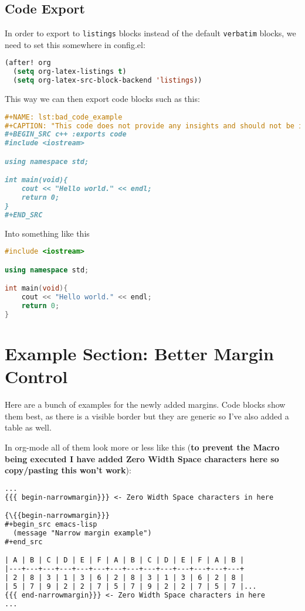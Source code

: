 \documentclass[a4paper,oneside,toc=bibliography,toc=listof]{scrbook}
\begin{document}
\section{Code Export}
\label{sec:orgecc9ca5}
In order to export to \texttt{listings} blocks instead of the default \texttt{verbatim} blocks, we need to set this somewhere in config.el:
\begin{lstlisting}[language=Lisp,numbers=none]
(after! org
  (setq org-latex-listings t)
  (setq org-latex-src-block-backend 'listings))
\end{lstlisting}

This way we can then export code blocks such as this:
\begin{lstlisting}[language=org,numbers=none]
#+NAME: lst:bad_code_example
#+CAPTION: "This code does not provide any insights and should not be included."
#+BEGIN_SRC c++ :exports code
#include <iostream>

using namespace std;

int main(void){
    cout << "Hello world." << endl;
    return 0;
}
#+END_SRC
\end{lstlisting}

Into something like this

\begin{lstlisting}[language=c++,label=lst:bad_code_example,caption={``This code does not provide any insights and should not be included.''},captionpos=b,numbers=none]
#include <iostream>

using namespace std;

int main(void){
    cout << "Hello world." << endl;
    return 0;
}
\end{lstlisting}
\chapter{Example Section: Better Margin Control}
\label{sec:orgffd2a0c}
Here are a bunch of examples for the newly added margins. Code blocks show them best, as there is a visible border but they are generic so I've also added a table as well.

In org-mode all of them look more or less like this (\textbf{to prevent the Macro being executed I have added Zero Width Space characters here so copy/pasting this won't work}):
\begin{lstlisting}[language=org,numbers=none]
...
{{{ begin-narrowmargin}}} <- Zero Width Space characters in here

{\{{begin-narrowmargin}}}
#+begin_src emacs-lisp
  (message "Narrow margin example")
#+end_src

| A | B | C | D | E | F | A | B | C | D | E | F | A | B |
|---+---+---+---+---+---+---+---+---+---+---+---+---+---+
| 2 | 8 | 3 | 1 | 3 | 6 | 2 | 8 | 3 | 1 | 3 | 6 | 2 | 8 |
| 5 | 7 | 9 | 2 | 2 | 7 | 5 | 7 | 9 | 2 | 2 | 7 | 5 | 7 |...
{{{ end-narrowmargin}}} <- Zero Width Space characters in here
...
\end{lstlisting}
\end{document}
